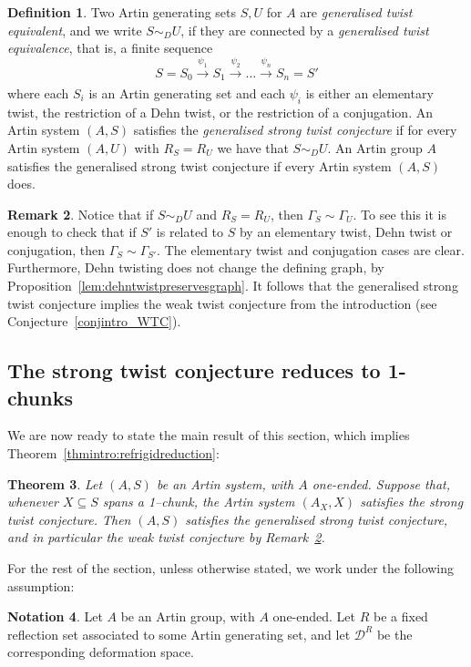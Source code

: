 \documentclass[svgnames]{amsart}
\theoremstyle{plain}
\newtheorem{thm}{Theorem}[section]
\theoremstyle{definition}
\newtheorem{defn}[thm]{Definition}
\newtheorem{rem}[thm]{Remark}
\newtheorem{notation}[thm]{Notation}
\newcommand{\crush}[2]{\mathcal{#1}^{#2}}
\begin{document}
\begin{defn}\label{def:gentwisteq}
    Two Artin generating sets $S,U$ for $A$ are \emph{generalised twist equivalent}, and we write $S\sim_D U$, if they are connected by a \emph{generalised twist equivalence}, that is, a finite sequence $$S=S_0\xrightarrow[]{\psi_1}S_1\xrightarrow[]{\psi_2}\ldots\xrightarrow[]{\psi_n}S_n=S'$$
    where each $S_i$ is an Artin generating set and each $\psi_i$ is either an elementary twist, the restriction of a Dehn twist, or the restriction of a conjugation. An Artin system $(A,S)$ satisfies the \emph{generalised strong twist conjecture} if for every Artin system $(A,U)$ with $R_S=R_U$ we have that $S\sim_D U$. An Artin group $A$ satisfies the generalised strong twist conjecture if every Artin system $(A,S)$ does.
\end{defn}
\begin{rem}\label{rem:gtc_implies_wtc}
    Notice that if $S\sim_D U$ and $R_S=R_U$, then $\Gamma_S\sim \Gamma_{U}$. To see this it is enough to check that if $S'$ is related to $S$ by an elementary twist, Dehn twist or conjugation, then $\Gamma_{S} \sim \Gamma_{S'}$. The elementary twist and conjugation cases are clear. Furthermore, Dehn twisting does not change the defining graph, by Proposition~\ref{lem:dehntwistpreservesgraph}. It follows that the generalised strong twist conjecture implies the weak twist conjecture from the introduction (see Conjecture~\ref{conjintro_WTC}).
\end{rem}


\subsection{The strong twist conjecture reduces to 1-chunks}\label{sec:proof_of_refrigid}
We are now ready to state the main result of this section, which implies Theorem~\ref{thmintro:refrigidreduction}:

\begin{thm}\label{thm:refrigidreduction}
    Let $(A,S)$ be an Artin system, with $A$ one-ended. Suppose that, whenever $X\subseteq S$ spans a 1--chunk, the Artin system $(A_X,X)$ satisfies the strong twist conjecture. Then $(A,S)$ satisfies the generalised strong twist conjecture, and in particular the weak twist conjecture by Remark~\ref{rem:gtc_implies_wtc}.
\end{thm}

\noindent For the rest of the section, unless otherwise stated, we work under the following assumption:
\begin{notation}\label{notation:ASR} Let $A$ be an Artin group, with $A$ one-ended. Let $R$ be a fixed reflection set associated to some Artin generating set, and let $\crush{D}{R}$ be the corresponding deformation space. \end{notation}
\end{document}
